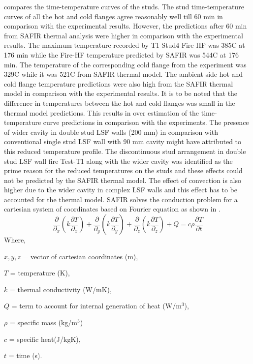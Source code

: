  compares the time-temperature curves of the studs. The stud time-temperature curves of all the hot and cold flanges agree reasonably well till 60 min in comparison with the experimental results. However, the predictions after 60 min from SAFIR thermal analysis were higher in comparison with the experimental results. The maximum temperature recorded by T1-Stud4-Fire-HF was 385\degree C at 176 min while the Fire-HF temperature predicted by SAFIR was 544\degree C at 176 min. The temperature of the corresponding cold flange from the experiment was 329\degree C while it was 521\degree C from SAFIR thermal model. The ambient side hot and cold flange temperature predictions were also high from the SAFIR thermal model in comparison with the experimental results. It is to be noted that the difference in temperatures between the hot and cold flanges was small in the thermal model predictions. This results in over estimation of the time-temperature curve predictions in comparison with the experiments. The presence of wider cavity in double stud LSF walls (200 mm) in comparison with conventional single stud LSF wall with 90 mm cavity might have attributed to this reduced temperature profile. The discontinuous stud arrangement in double stud LSF wall fire Test-T1 along with the wider cavity was identified as the prime reason for the reduced temperatures on the studs and these effects could not be predicted by the SAFIR thermal model. The effect of convection is also higher due to the wider cavity in complex LSF walls and this effect has to be accounted for the thermal model. SAFIR solves the conduction problem for a cartesian system of coordinates based on Fourier equation as shown in .
\begin{equation}\label{eq:safir-conduction}
	\dfrac{\partial}{\partial_x}\left(k\dfrac{\partial T}{\partial_x}\right)+\dfrac{\partial}{\partial_y}\left(k\dfrac{\partial T}{\partial_y}\right)+\dfrac{\partial}{\partial_z}\left(k\dfrac{\partial T}{\partial_z}\right)+Q=c\rho\dfrac{\partial T}{\partial t}
\end{equation}
Where,
\begin{description}[itemsep=0pt,parsep=0pt]
	\item $x,y,z$ = vector of cartesian coordinates (m),
	\item $T$ = temperature (K),
	\item $k$ = thermal conductivity (W/mK),
	\item $Q$ = term to account for internal generation of heat (W/m$^3$),
	\item $\rho$ = specific mass (kg/m$^3$)
	\item $c$ = specific heat(J/kgK),
	\item $t$ = time (s).
\end{description}

